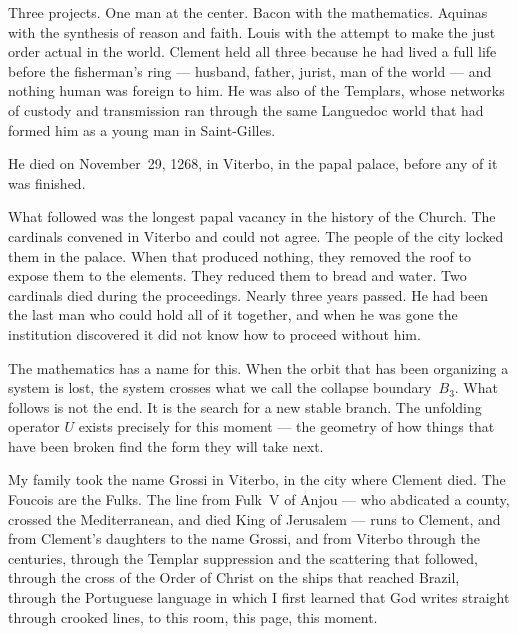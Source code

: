 \documentclass[12pt, oneside]{book}
\theoremstyle{plain}
\theoremstyle{definition}
\theoremstyle{remark}
\begin{document}
\vspace{0.4cm}
\noindent Three projects. One man at the center.
Bacon with the mathematics. Aquinas with the synthesis
of reason and faith. Louis with the attempt to make
the just order actual in the world. Clement held all
three because he had lived a full life before the
fisherman's ring --- husband, father, jurist, man of
the world --- and nothing human was foreign to him.
He was also of the Templars, whose networks of custody
and transmission ran through the same Languedoc world
that had formed him as a young man in Saint-Gilles.

\vspace{0.4cm}
\noindent He died on November~29, 1268, in Viterbo,
in the papal palace, before any of it was finished.

\vspace{0.4cm}
\noindent What followed was the longest papal vacancy in
the history of the Church. The cardinals convened in
Viterbo and could not agree. The people of the city
locked them in the palace. When that produced nothing,
they removed the roof to expose them to the elements.
They reduced them to bread and water. Two cardinals died
during the proceedings. Nearly three years passed.
He had been the last man who could hold all of it
together, and when he was gone the institution
discovered it did not know how to proceed without him.

\vspace{0.4cm}
\noindent The mathematics has a name for this. When the
orbit that has been organizing a system is lost, the
system crosses what we call the collapse boundary~$B_3$.
What follows is not the end. It is the search for a new
stable branch. The unfolding operator $U$ exists precisely
for this moment --- the geometry of how things that have
been broken find the form they will take next.

\vspace{0.4cm}
\noindent My family took the name Grossi in Viterbo,
in the city where Clement died. The Foucois are the Fulks.
The line from Fulk~V of Anjou --- who abdicated a county,
crossed the Mediterranean, and died King of Jerusalem ---
runs to Clement, and from Clement's daughters to the name
Grossi, and from Viterbo through the centuries, through
the Templar suppression and the scattering that followed,
through the cross of the Order of Christ on the ships
that reached Brazil, through the Portuguese language in
which I first learned that God writes straight through
crooked lines, to this room, this page, this moment.
\end{document}
